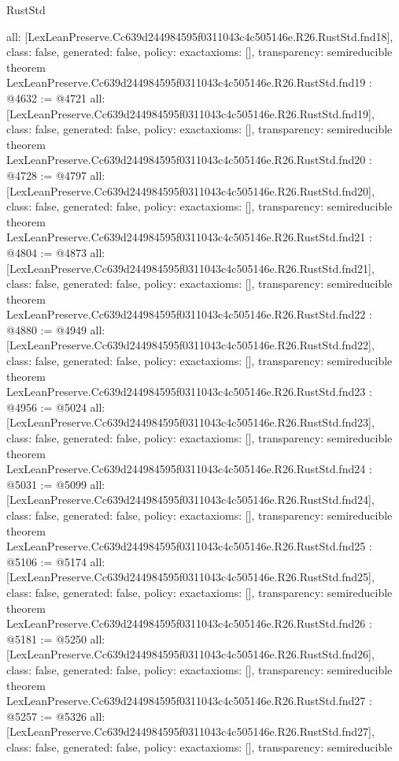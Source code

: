 \begin{lexlean}{RustStd}
\begin{coremodule}
{  all: [LexLeanPreserve.Cc639d244984595f0311043c4c505146e.R26.RustStd.fnd18],
  class: false,
  generated: false,
  policy: exact{axioms: []},
  transparency: semireducible
}
theorem LexLeanPreserve.Cc639d244984595f0311043c4c505146e.R26.RustStd.fnd19 : @4632 := @4721 {
  all: [LexLeanPreserve.Cc639d244984595f0311043c4c505146e.R26.RustStd.fnd19],
  class: false,
  generated: false,
  policy: exact{axioms: []},
  transparency: semireducible
}
theorem LexLeanPreserve.Cc639d244984595f0311043c4c505146e.R26.RustStd.fnd20 : @4728 := @4797 {
  all: [LexLeanPreserve.Cc639d244984595f0311043c4c505146e.R26.RustStd.fnd20],
  class: false,
  generated: false,
  policy: exact{axioms: []},
  transparency: semireducible
}
theorem LexLeanPreserve.Cc639d244984595f0311043c4c505146e.R26.RustStd.fnd21 : @4804 := @4873 {
  all: [LexLeanPreserve.Cc639d244984595f0311043c4c505146e.R26.RustStd.fnd21],
  class: false,
  generated: false,
  policy: exact{axioms: []},
  transparency: semireducible
}
theorem LexLeanPreserve.Cc639d244984595f0311043c4c505146e.R26.RustStd.fnd22 : @4880 := @4949 {
  all: [LexLeanPreserve.Cc639d244984595f0311043c4c505146e.R26.RustStd.fnd22],
  class: false,
  generated: false,
  policy: exact{axioms: []},
  transparency: semireducible
}
theorem LexLeanPreserve.Cc639d244984595f0311043c4c505146e.R26.RustStd.fnd23 : @4956 := @5024 {
  all: [LexLeanPreserve.Cc639d244984595f0311043c4c505146e.R26.RustStd.fnd23],
  class: false,
  generated: false,
  policy: exact{axioms: []},
  transparency: semireducible
}
theorem LexLeanPreserve.Cc639d244984595f0311043c4c505146e.R26.RustStd.fnd24 : @5031 := @5099 {
  all: [LexLeanPreserve.Cc639d244984595f0311043c4c505146e.R26.RustStd.fnd24],
  class: false,
  generated: false,
  policy: exact{axioms: []},
  transparency: semireducible
}
theorem LexLeanPreserve.Cc639d244984595f0311043c4c505146e.R26.RustStd.fnd25 : @5106 := @5174 {
  all: [LexLeanPreserve.Cc639d244984595f0311043c4c505146e.R26.RustStd.fnd25],
  class: false,
  generated: false,
  policy: exact{axioms: []},
  transparency: semireducible
}
theorem LexLeanPreserve.Cc639d244984595f0311043c4c505146e.R26.RustStd.fnd26 : @5181 := @5250 {
  all: [LexLeanPreserve.Cc639d244984595f0311043c4c505146e.R26.RustStd.fnd26],
  class: false,
  generated: false,
  policy: exact{axioms: []},
  transparency: semireducible
}
theorem LexLeanPreserve.Cc639d244984595f0311043c4c505146e.R26.RustStd.fnd27 : @5257 := @5326 {
  all: [LexLeanPreserve.Cc639d244984595f0311043c4c505146e.R26.RustStd.fnd27],
  class: false,
  generated: false,
  policy: exact{axioms: []},
  transparency: semireducible
}
\end{coremodule}
\end{lexlean}
